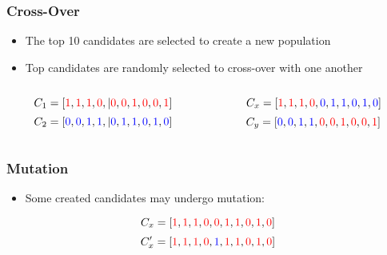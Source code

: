 \documentclass{beamer}
\begin{document}
\begin{frame}
  \frametitle{Cross-Over}
\begin{itemize}
\item The top 10 candidates are selected to create a new population
\item Top candidates are randomly selected to cross-over with one another
\end{itemize}

  \begin{columns}
  \begin{column}{0.5\textwidth}

\[
C_1=[ \textcolor{red}{1},  \textcolor{red}{1}, \textcolor{red}{1},  \textcolor{red}{0},|  \textcolor{red}{0},  \textcolor{red}{0}, \textcolor{red}{1}, \textcolor{red}{0}, \textcolor{red}{0}, \textcolor{red}{1} ]
\]
\[C_2=[  \textcolor{blue}{0}, \textcolor{blue}{0}, \textcolor{blue}{1}, \textcolor{blue}{1},| \textcolor{blue}{0}, \textcolor{blue}{1}, \textcolor{blue}{1}, \textcolor{blue}{0}, \textcolor{blue}{1}, \textcolor{blue}{0} ]
\]
\end{column}
 \begin{column}{0.5\textwidth}

   \[
C_x=[ \textcolor{red}{1},  \textcolor{red}{1}, \textcolor{red}{1},  \textcolor{red}{0}, \textcolor{blue}{0}, \textcolor{blue}{1}, \textcolor{blue}{1}, \textcolor{blue}{0}, \textcolor{blue}{1}, \textcolor{blue}{0} ]
\]
\[C_y = [  \textcolor{blue}{0}, \textcolor{blue}{0}, \textcolor{blue}{1}, \textcolor{blue}{1}, \textcolor{red}{0},  \textcolor{red}{0}, \textcolor{red}{1}, \textcolor{red}{0}, \textcolor{red}{0}, \textcolor{red}{1} ]
\]
  \end{column}
  \end{columns}
\end{frame}

\begin{frame}
  \frametitle{Mutation}
\begin{itemize}
  \item Some created candidates may undergo mutation:
\end{itemize}
\[
C_x=[ \textcolor{red}{1},  \textcolor{red}{1}, \textcolor{red}{1},  \textcolor{red}{0}, \textcolor{red}{0}, \textcolor{red}{1}, \textcolor{red}{1}, \textcolor{red}{0}, \textcolor{red}{1}, \textcolor{red}{0} ]
\]
\[C_x'=[ \textcolor{red}{1},  \textcolor{red}{1}, \textcolor{red}{1},  \textcolor{red}{0}, \textcolor{blue}{1}, \textcolor{red}{1}, \textcolor{red}{1}, \textcolor{red}{0}, \textcolor{red}{1}, \textcolor{red}{0} ]
\]
\end{frame}
\end{document}
